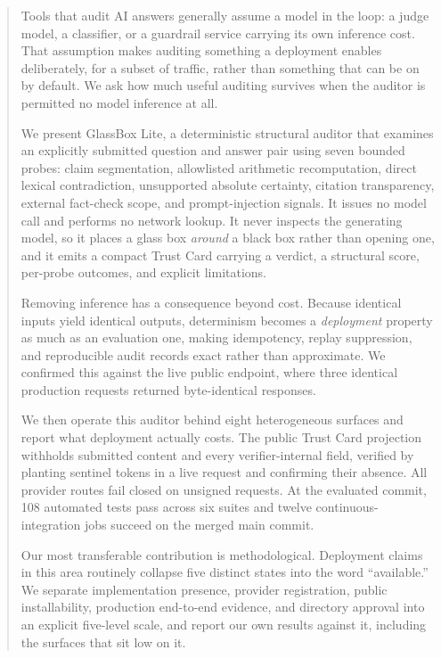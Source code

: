 
\maketitle

\begin{abstract}
\noindent
Tools that audit AI answers generally assume a model in the loop: a judge model, a
classifier, or a guardrail service carrying its own inference cost. That assumption makes
auditing something a deployment enables deliberately, for a subset of traffic, rather
than something that can be on by default. We ask how much useful auditing survives when
the auditor is permitted no model inference at all.

We present GlassBox Lite, a deterministic structural auditor that examines an explicitly
submitted question and answer pair using seven bounded probes: claim segmentation,
allowlisted arithmetic recomputation, direct lexical contradiction, unsupported absolute
certainty, citation transparency, external fact-check scope, and prompt-injection
signals. It issues no model call and performs no network lookup. It never inspects the
generating model, so it places a glass box \emph{around} a black box rather than opening
one, and it emits a compact Trust Card carrying a verdict, a structural score, per-probe
outcomes, and explicit limitations.

Removing inference has a consequence beyond cost. Because identical inputs yield
identical outputs, determinism becomes a \emph{deployment} property as much as an
evaluation one, making idempotency, replay suppression, and reproducible audit records
exact rather than approximate. We confirmed this against the live public endpoint, where
three identical production requests returned byte-identical responses.

We then operate this auditor behind eight heterogeneous surfaces and report what
deployment actually costs. The public Trust Card projection withholds submitted content
and every verifier-internal field, verified by planting sentinel tokens in a live request
and confirming their absence. All provider routes fail closed on unsigned requests. At
the evaluated commit, 108 automated tests pass across six suites and twelve
continuous-integration jobs succeed on the merged main commit.

Our most transferable contribution is methodological. Deployment claims in this area
routinely collapse five distinct states into the word ``available.'' We separate
implementation presence, provider registration, public installability, production
end-to-end evidence, and directory approval into an explicit five-level scale, and report
our own results against it, including the surfaces that sit low on it.


\end{abstract}

